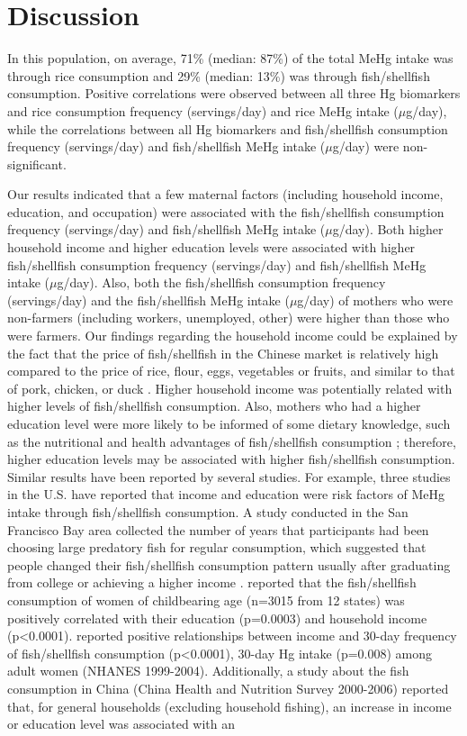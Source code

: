 \section{Discussion} 

In this population, on average, 71\% (median: 87\%) of the total MeHg intake was through rice consumption and 29\% (median: 13\%) was through fish/shellfish consumption. Positive correlations were observed between all three Hg biomarkers and rice consumption frequency (servings/day) and rice MeHg intake (\({\mu}\)g/day), while the correlations between all Hg biomarkers and fish/shellfish consumption frequency (servings/day) and fish/shellfish MeHg intake (\({\mu}\)g/day) were non-significant.

Our results indicated that a few maternal factors (including household income, education, and occupation) were associated with the fish/shellfish consumption frequency (servings/day) and fish/shellfish MeHg intake (\({\mu}\)g/day). Both higher household income and higher education levels were associated with higher fish/shellfish consumption frequency (servings/day) and fish/shellfish MeHg intake (\({\mu}\)g/day). Also, both the fish/shellfish consumption frequency (servings/day) and the fish/shellfish MeHg intake (\({\mu}\)g/day) of mothers who were non-farmers (including workers, unemployed, other) were higher than those who were farmers. Our findings regarding the household income could be explained by the fact that the price of fish/shellfish in the Chinese market is relatively high compared to the price of rice, flour, eggs, vegetables or fruits, and similar to that of pork, chicken, or duck \citep{china2016stat}. Higher household income was potentially related with higher levels of fish/shellfish consumption. Also, mothers who had a higher education level were more likely to be informed of some dietary knowledge, such as the nutritional and health advantages of fish/shellfish consumption \citep{knobeloch2005fish,wang2009consumers,zhou2015determinants}; therefore, higher education levels may be associated with higher fish/shellfish consumption. Similar results have been reported by several studies. For example, three studies in the U.S. have reported that income and education were risk factors of MeHg intake through fish/shellfish consumption. A study conducted in the San Francisco Bay area collected the number of years that participants had been choosing large predatory fish for regular consumption, which suggested that people changed their fish/shellfish consumption pattern usually after graduating from college or achieving a higher income \citep{hightower2003mercury}. \cite{knobeloch2005fish} reported that the fish/shellfish consumption of women of childbearing age (n=3015 from 12 states) was positively correlated with their education (p=0.0003) and household income (p<0.0001). \cite{mahaffey2009adult} reported positive relationships between income and 30-day frequency of fish/shellfish consumption (p<0.0001), 30-day Hg intake (p=0.008) among adult women (NHANES 1999-2004). Additionally, a study about the fish consumption in China (China Health and Nutrition Survey 2000-2006) reported that, for general households (excluding household fishing), an increase in income or education level was associated with an 